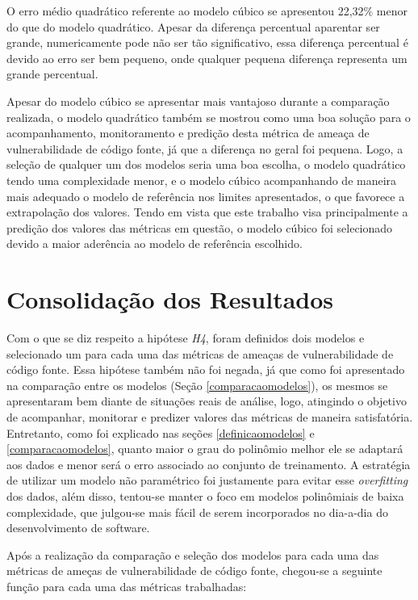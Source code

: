 O erro médio quadrático referente ao modelo cúbico se apresentou 22,32\% menor
do que do modelo quadrático. Apesar da diferença percentual aparentar ser
grande, numericamente pode não ser tão significativo, essa diferença percentual
é devido ao erro ser bem pequeno, onde qualquer pequena diferença representa um
grande percentual.

Apesar do modelo cúbico se apresentar mais vantajoso durante a comparação
realizada, o modelo quadrático também se mostrou como uma boa solução para o
acompanhamento, monitoramento e predição desta métrica de ameaça de
vulnerabilidade de código fonte, já que a diferença no geral foi pequena. Logo,
a seleção de qualquer um dos modelos seria uma boa escolha, o modelo quadrático
tendo uma complexidade menor, e o modelo cúbico acompanhando de maneira
mais adequado o modelo de referência nos limites apresentados, o que favorece a
extrapolação dos valores. Tendo em vista que este trabalho visa principalmente
a predição dos valores das métricas em questão, o modelo cúbico foi selecionado
devido a maior aderência ao modelo de referência escolhido.


\section{Consolidação dos Resultados}

Com o que se diz respeito a hipótese \textit{H4}, foram definidos dois modelos e
selecionado um para cada uma das métricas de ameaças de vulnerabilidade de
código fonte. Essa hipótese também não foi negada, já que como foi apresentado
na comparação entre os modelos (Seção \ref{comparacaomodelos}), os mesmos se
apresentaram bem diante de situações reais de análise, logo, atingindo o
objetivo de acompanhar, monitorar e predizer valores das métricas de maneira
satisfatória. Entretanto, como foi explicado nas seções \ref{definicaomodelos} e
\ref{comparacaomodelos}, quanto maior o grau do polinômio melhor ele se adaptará
aos dados e menor será o erro associado ao conjunto de treinamento. A estratégia
de utilizar um modelo não paramétrico foi justamente para evitar esse
\textit{overfitting} dos dados, além disso, tentou-se manter o foco em modelos
polinômiais de baixa complexidade, que julgou-se mais fácil de serem
incorporados no dia-a-dia do desenvolvimento de software.

Após a realização da comparação e seleção dos modelos para cada uma das métricas
de ameças de vulnerabilidade de código fonte, chegou-se a seguinte função para
cada uma das métricas trabalhadas:

